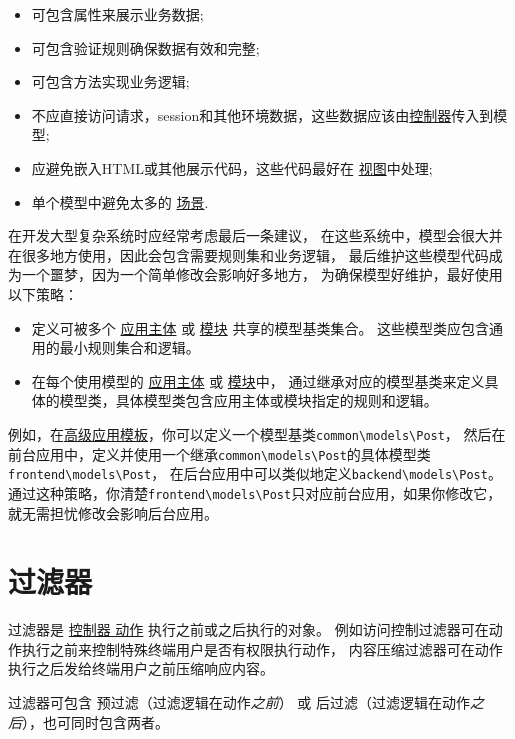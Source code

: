 \begin{itemize}
\item 可包含属性来展示业务数据;
\item 可包含验证规则确保数据有效和完整;
\item 可包含方法实现业务逻辑;
\item 不应直接访问请求，session和其他环境数据，这些数据应该由\hyperref[structure-controllers.md]{控制器}传入到模型;
\item 应避免嵌入HTML或其他展示代码，这些代码最好在 \hyperref[structure-views.md]{视图}中处理;
\item 单个模型中避免太多的 \hyperref[structure-models.md::::scenarios]{场景}.
\end{itemize}
在开发大型复杂系统时应经常考虑最后一条建议，
在这些系统中，模型会很大并在很多地方使用，因此会包含需要规则集和业务逻辑，
最后维护这些模型代码成为一个噩梦，因为一个简单修改会影响好多地方，
为确保模型好维护，最好使用以下策略：

\begin{itemize}
\item 定义可被多个 \hyperref[structure-applications.md]{应用主体} 或 \hyperref[structure-modules.md]{模块} 共享的模型基类集合。
这些模型类应包含通用的最小规则集合和逻辑。
\item 在每个使用模型的 \hyperref[structure-applications.md]{应用主体} 或 \hyperref[structure-modules.md]{模块}中，
通过继承对应的模型基类来定义具体的模型类，具体模型类包含应用主体或模块指定的规则和逻辑。
\end{itemize}
例如，在\hyperref[tutorial-advanced-app.md]{高级应用模板}，你可以定义一个模型基类\lstinline|common\models\Post|，
然后在前台应用中，定义并使用一个继承\lstinline|common\models\Post|的具体模型类\lstinline|frontend\models\Post|，
在后台应用中可以类似地定义\lstinline|backend\models\Post|。
通过这种策略，你清楚\lstinline|frontend\models\Post|只对应前台应用，如果你修改它，就无需担忧修改会影响后台应用。



\label{structure-filters.md}\section{过滤器}
过滤器是 \hyperref[structure-controllers.md::actions]{控制器 动作} 执行之前或之后执行的对象。
例如访问控制过滤器可在动作执行之前来控制特殊终端用户是否有权限执行动作，
内容压缩过滤器可在动作执行之后发给终端用户之前压缩响应内容。

过滤器可包含 预过滤（过滤逻辑在动作\textit{之前}） 或 后过滤（过滤逻辑在动作\textit{之后}），也可同时包含两者。

